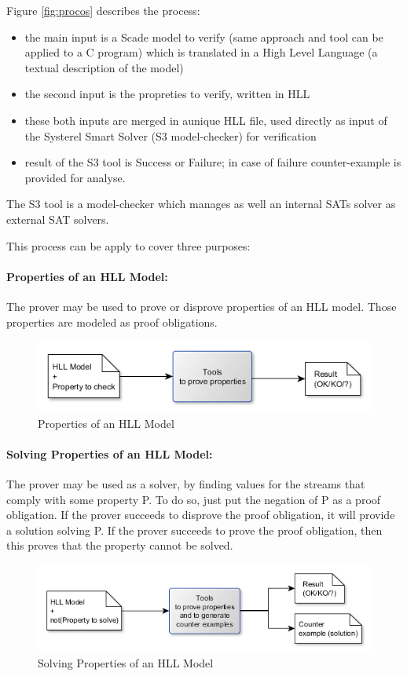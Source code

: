 \documentclass{article}
\begin{document}
Figure \ref{fig:procos} describes the process:
\begin{itemize}
\item the main input is a Scade model to  verify (same approach and tool can be applied to a C program) which is translated in a High Level Language (a textual description of the model)
\item the second input is the propreties to verify, written in HLL
\item these both inputs are merged in aunique HLL file, used directly as input of the Systerel Smart Solver (S3 model-checker) for verification
\item result of the S3 tool is Success or Failure; in case of failure counter-example is provided for analyse.
\end{itemize}

The S3 tool is a model-checker which manages as well an internal SATs solver as external SAT solvers.

This process can be apply to cover three purposes:


\paragraph{ Properties of an HLL Model: } The prover may be used to prove or disprove properties of an HLL model. Those properties are modeled as proof obligations.
\begin{figure}[h!]
\centering
\includegraphics[width=1\textwidth]{Use_property_checker}
\caption{Properties of an HLL Model}
\label{fig:proch}
\end{figure}

\paragraph{ Solving Properties of an HLL Model: } The prover may be used as a solver, by finding values for the streams that comply with some property P. To do so, just put the negation of P as a proof obligation. If the prover succeeds to disprove the proof obligation, it will provide a solution solving P. If the prover succeeds to prove the proof obligation, then this proves that the property cannot be solved.
\begin{figure}[h!]
\centering
\includegraphics[width=1\textwidth]{Use_property_solver}
\caption{Solving Properties of an HLL Model}
\label{fig:prosolv}
\end{figure}
\end{document}
